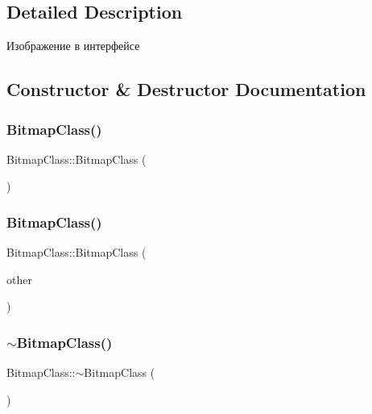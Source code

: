 \subsection{Detailed Description}
Изображение в интерфейсе 

\subsection{Constructor \& Destructor Documentation}
\mbox{\label{class_bitmap_class_a0f4b9cd7df6c426024269b5c6a44dca9}} 
\subsubsection{\texorpdfstring{Bitmap\+Class()}{BitmapClass()}\hspace{0.1cm}{\footnotesize\ttfamily [1/2]}}
{\footnotesize\ttfamily Bitmap\+Class\+::\+Bitmap\+Class (\begin{DoxyParamCaption}{ }\end{DoxyParamCaption})}

\mbox{\label{class_bitmap_class_a0933d9b08bfd5035e80c9c727456dcbb}} 
\subsubsection{\texorpdfstring{Bitmap\+Class()}{BitmapClass()}\hspace{0.1cm}{\footnotesize\ttfamily [2/2]}}
{\footnotesize\ttfamily Bitmap\+Class\+::\+Bitmap\+Class (\begin{DoxyParamCaption}\item[{const \hyperlink{class_bitmap_class}{Bitmap\+Class} \&}]{other }\end{DoxyParamCaption})}

\mbox{\label{class_bitmap_class_a3513d51b4fc4219b4ddb09fd23cda528}} 
\subsubsection{\texorpdfstring{$\sim$\+Bitmap\+Class()}{~BitmapClass()}}
{\footnotesize\ttfamily Bitmap\+Class\+::$\sim$\+Bitmap\+Class (\begin{DoxyParamCaption}{ }\end{DoxyParamCaption})}



